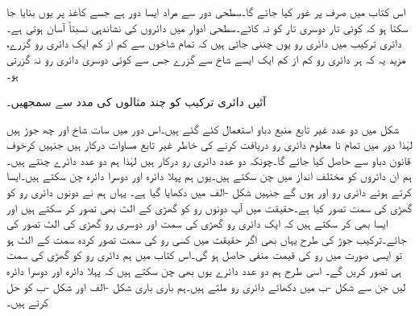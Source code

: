 اس کتاب میں صرف  پر غور کیا جائے گا۔سطحی دور سے مراد ایسا دور ہے جسے کاغذ پر یوں بنایا جا سکتا ہو کہ کوئی تار دوسری تار کو نہ کاٹے۔سطحی ادوار میں دائروں کی نشاندہی نسبتاً آسان ہوتی ہے۔دائری ترکیب میں دائری رو یوں چننی جاتی ہیں کہ تمام شاخوں سے کم از کم ایک دائری رو گزرے، مزید یہ کہ ہر دائری رو کم از کم ایک ایسے شاخ سے گزرے جس سے کوئی دوسری دائری رو نہ گزرتی ہو۔

آئیں دائری ترکیب کو چند مثالوں کی مدد سے سمجھیں۔

 شکل  میں دو عدد غیر تابع منبع دباو استعمال کئے گئے ہیں۔اس دور میں  سات شاخ اور چھ جوڑ ہیں لہٰذا دور میں تمام نا معلوم دائری رو دریافت کرنے کی خاطر  غیر تابع مساوات درکار ہیں جنہیں کرخوف قانون دباو سے حاصل کیا جائے گا۔چونکہ دو عدد دائری رو درکار ہیں لہٰذا ہم دو عدد دائرے چنتے ہیں۔ہم ان دائروں کو مختلف انداز میں چن سکتے ہیں۔یوں ہم پہلا دائرہ  اور دوسرا دائرہ  چن سکتے ہیں۔ایسا کرتے ہوئے دائری رو  اور  ہوں گے جنہیں  شکل -الف میں دکھایا گیا ہے۔ یہاں ہم نے دونوں دائری رو کو گھڑی کی سمت تصور کیا ہے۔حقیقت میں آپ دونوں رو کو گھڑی کے الٹ بھی تصور کر سکتے ہیں اور ایسا بھی کر سکتے ہیں کہ ایک دائری رو گھڑی کی سمت اور دوسری رو گھڑی کی الٹ تصور کی جائے۔ترکیب جوڑ کی طرح یہاں بھی اگر حقیقت میں کسی رو کی سمت تصور کردہ سمت کے الٹ ہو تو ایسی صورت میں رو کی قیمت منفی حاصل ہو گی۔اس کتاب میں ہم دائری رو کو گھڑی کی سمت ہی تصور کریں گے۔ اسی طرح ہم دو عدد دائرے یوں بھی چن سکتے ہیں کہ پہلا دائرہ  اور دوسرا دائرہ  لیں جن سے شکل -ب میں دکھائے دائری رو ملتے ہیں۔ہم باری باری شکل -الف اور شکل -ب کو حل کرتے ہیں۔

